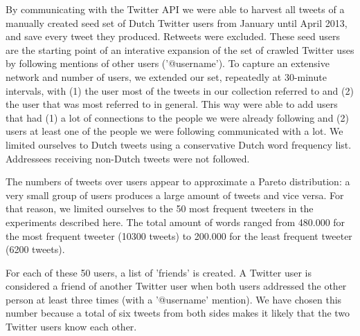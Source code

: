 \documentclass[11pt]{article}
\begin{document}

By communicating with the Twitter API we were able to harvest all tweets of a manually created seed set of Dutch Twitter users from January until April 2013, and save every tweet they produced. Retweets were excluded. These seed users are the starting point of an interative expansion of the set of crawled Twitter uses by following mentions of other users ('@username'). To capture an extensive network and number of users, we extended our set, repeatedly at 30-minute intervals, with (1) the user most of the tweets in our collection referred to and (2) the user that was most referred to in general. This way were able to add users that had (1) a lot of connections to the people we were already following and (2) users at least one of the people we were following communicated with a lot. We limited ourselves to Dutch tweets using a conservative Dutch word frequency list. Addressees receiving non-Dutch tweets were not followed.

The numbers of tweets over users appear to approximate a Pareto distribution: a very small group of users produces a large amount of tweets and vice versa. For that reason, we limited ourselves to the 50 most frequent tweeters in the experiments described here. The total amount of words ranged from 480.000 for the most frequent tweeter (10300 tweets) to 200.000 for the least frequent tweeter (6200 tweets). 

For each of these 50 users, a list of 'friends' is created. A Twitter user is considered a friend of another Twitter user when both users addressed the other person at least three times (with a '@username' mention). We have chosen this number because a total of six tweets from both sides makes it likely that the two Twitter users know each other. 
\end{document}
